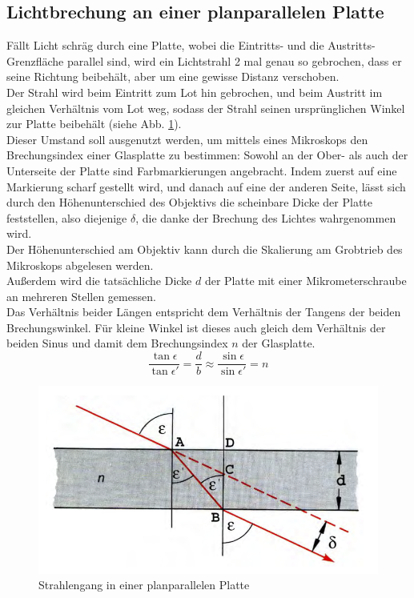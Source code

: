 \documentclass[12pt,a4paper]{article}
\begin{document}
\begin{multicols}{2}
\section{Lichtbrechung an einer planparallelen Platte}

Fällt Licht schräg durch eine Platte, wobei die Eintritts- und die Austritts-Grenzfläche parallel sind, wird ein Lichtstrahl 2 mal genau so gebrochen, dass er seine Richtung beibehält, aber um eine gewisse Distanz verschoben.\\
Der Strahl wird beim Eintritt zum Lot hin gebrochen, und beim Austritt im gleichen Verhältnis vom Lot weg, sodass der Strahl seinen ursprünglichen Winkel zur Platte beibehält (siehe Abb. \ref{fig:planparallele_Skizze}).\\
Dieser Umstand soll ausgenutzt werden, um mittels eines Mikroskops den Brechungsindex einer Glasplatte zu bestimmen: Sowohl an der Ober- als auch der Unterseite  der Platte sind Farbmarkierungen angebracht. Indem zuerst auf eine Markierung scharf gestellt wird, und danach auf eine der anderen Seite, lässt sich durch den Höhenunterschied des Objektivs die scheinbare Dicke der Platte feststellen, also diejenige $\delta$, die danke der Brechung des Lichtes wahrgenommen wird.\\
Der Höhenunterschied am Objektiv kann durch die Skalierung am Grobtrieb des Mikroskops abgelesen werden.\\
Außerdem wird die tatsächliche Dicke $d$ der Platte mit einer Mikrometerschraube an mehreren Stellen gemessen.\\
Das Verhältnis beider Längen entspricht dem Verhältnis der Tangens der beiden Brechungswinkel. Für kleine Winkel ist dieses auch gleich dem Verhältnis der beiden Sinus und damit dem Brechungsindex $n$ der Glasplatte.
$$\frac{\tan{\epsilon}}{\tan{\epsilon '}}=\frac{d}{b}\approx \frac{\sin{\epsilon}}{\sin{\epsilon '}}=n$$


\begin{figure}[H]
	\centering
	\includegraphics[scale=0.65]{./figure/planparallele_Skizze.png}
	\caption{Strahlengang in einer planparallelen Platte}
	\label{fig:planparallele_Skizze}
\end{figure}



\end{multicols}
\end{document}
